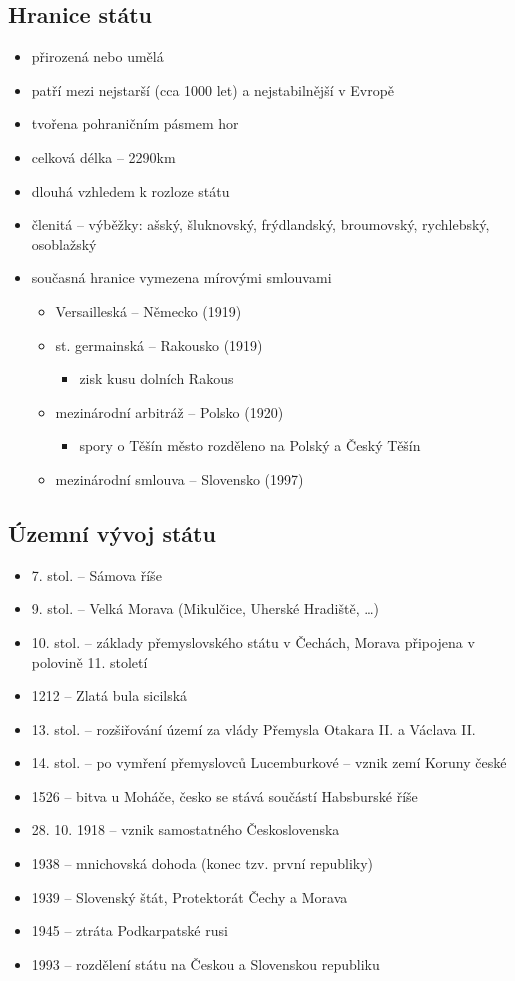 \subsection{Hranice státu}
\begin{itemize}
\item přirozená nebo umělá
\item patří mezi nejstarší (cca 1000 let) a nejstabilnější v Evropě
\item tvořena pohraničním pásmem hor
\item celková délka --  2290km 
\item dlouhá vzhledem k rozloze státu
\item členitá -- výběžky: ašský, šluknovský, frýdlandský, broumovský, rychlebský, osoblažský
\item současná hranice vymezena mírovými smlouvami 
	\begin{itemize}
	\item Versailleská -- Německo (1919)
	\item st. germainská -- Rakousko (1919)
		\begin{itemize}
		\item zisk kusu dolních Rakous 
		\end{itemize}
	\item mezinárodní arbitráž -- Polsko (1920)
		\begin{itemize}
		\item spory o Těšín \ra město rozděleno na Polský a Český Těšín
		\end{itemize}
	\item mezinárodní smlouva -- Slovensko (1997)
	\end{itemize}
\end{itemize}

\subsection{Územní vývoj státu}
\begin{itemize}
\item 7. stol. -- Sámova říše
\item 9. stol. -- Velká Morava (Mikulčice, Uherské Hradiště, \ldots)
\item 10. stol. -- základy přemyslovského státu v Čechách, Morava připojena v polovině 11. století
\item 1212 -- Zlatá bula sicilská
\item 13. stol. -- rozšiřování území za vlády Přemysla Otakara II. a Václava II.
\item 14. stol. -- po vymření přemyslovců Lucemburkové -- vznik zemí Koruny české
\item 1526 -- bitva u Moháče, česko se stává součástí Habsburské říše
\item 28. 10. 1918 -- vznik samostatného Československa
\item 1938 -- mnichovská dohoda (konec tzv. první republiky)
\item 1939 -- Slovenský štát, Protektorát Čechy a Morava
\item 1945 -- ztráta Podkarpatské rusi
\item 1993 -- rozdělení státu na Českou a Slovenskou republiku
\end{itemize}

